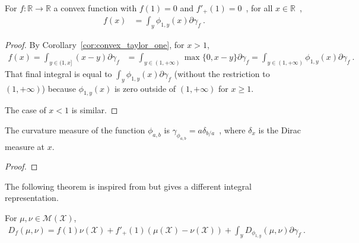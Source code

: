\begin{corollary}
  \label{cor:convex_taylor_statInfoFun}
  For $f: \mathbb{R} \to \mathbb{R}$ a convex function with $f(1) = 0$ and $f'_+(1) = 0$~, for all $x \in \mathbb{R}$~,
  \begin{align*}
  f(x) &= \int_{y} \phi_{1,y}(x) \partial\gamma_f \: .
  \end{align*}
\end{corollary}

\begin{proof}%
{}
By Corollary~\ref{cor:convex_taylor_one}, for $x > 1$,
\begin{align*}
f(x) = \int_{y \in (1, x]} (x - y) \partial\gamma_f
&= \int_{y \in (1, +\infty)} \max\{0, x - y\} \partial\gamma_f
= \int_{y \in (1, +\infty)} \phi_{1,y}(x) \partial\gamma_f
\: .
\end{align*}
That final integral is equal to $\int_y \phi_{1,y}(x) \partial\gamma_f$ (without the restriction to $(1, +\infty)$) because $\phi_{1,y}(x)$ is zero outside of $(1, +\infty)$ for $x \ge 1$.

The case of $x < 1$ is similar.
\end{proof}

\begin{lemma}
  \label{lem:curvatureMeasure_statInfoFun}
  The curvature measure of the function $\phi_{a,b}$ is $\gamma_{\phi_{a,b}} = a\delta_{b/a}$~, where $\delta_x$ is the Dirac measure at $x$.
\end{lemma}

\begin{proof}%
\uses{}

\end{proof}

The following theorem is inspired from \cite{liese2006divergences,liese2012phi} but gives a different integral representation.

\begin{theorem}
  \label{thm:fDiv_eq_integral_eGamma}
  For $\mu, \nu \in \mathcal M(\mathcal X)$,
  \begin{align*}
  D_f(\mu, \nu) = f(1) \nu(\mathcal X) + f'_+(1)(\mu(\mathcal X) - \nu(\mathcal X)) + \int_y D_{\phi_{1,y}}(\mu, \nu) \partial\gamma_f \: .
  \end{align*}
\end{theorem}

